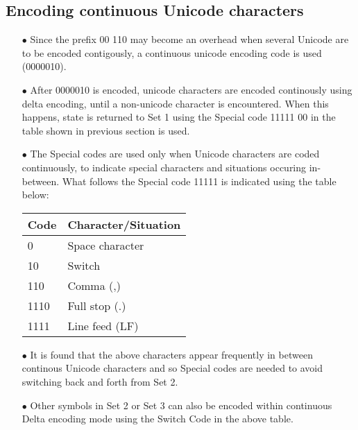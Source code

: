 \documentclass[]{article}
\begin{document}
\subsection{Encoding continuous Unicode characters}
\begin{itemize}
	\item[$\bullet$] Since the prefix 00 110 may become an overhead when several Unicode are to be encoded contigously, a continuous unicode encoding code is used (0000010).
	\item[$\bullet$] After 0000010 is encoded, unicode characters are encoded continously using delta encoding, until a non-unicode character is encountered.  When this happens, state is returned to Set 1 using the Special code 11111 00 in the table shown in previous section is used.
	\item[$\bullet$] The Special codes are used only when Unicode characters are coded continuously, to indicate special characters and situations occuring in-between. What follows the Special code 11111 is indicated using the table below:
	\item[] \begin{tabular}{ | l | l |} \hline
	﻿\textbf{Code} & ﻿\textbf{Character/Situation} \\ \hline
	0 & Space character \\ \hline
	10 & Switch \\ \hline
	110 & Comma (,) \\ \hline
	1110 & Full stop (.) \\ \hline
	1111 & Line feed (LF) \\ \hline
    \end{tabular}
	\item[$\bullet$] It is found that the above characters appear frequently in between continous Unicode characters and so Special codes are needed to avoid switching back and forth from Set 2.
	\item[$\bullet$] Other symbols in Set 2 or Set 3 can also be encoded within continuous Delta encoding mode using the Switch Code in the above table.
\end{itemize}
\end{document}
